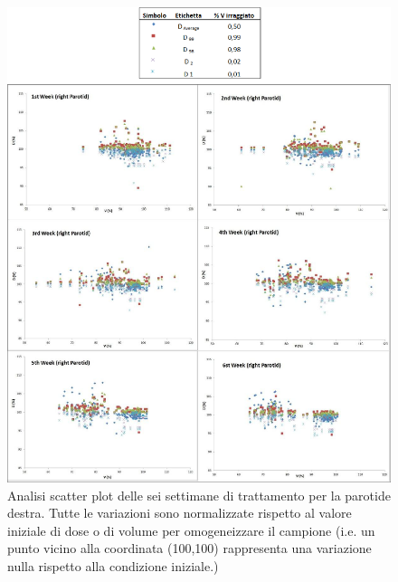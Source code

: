 \begin{figure}
\centering
\includegraphics[width=\textwidth]{./cap3/Modena_trend.png}
\caption{Analisi scatter plot delle sei settimane di trattamento per la parotide destra. Tutte le variazioni sono normalizzate rispetto al valore iniziale di dose o di volume per omogeneizzare il campione (i.e. un punto vicino alla coordinata (100,100) rappresenta una variazione nulla rispetto alla condizione iniziale.)}
\label{fig:Modena_trend}
\end{figure}

